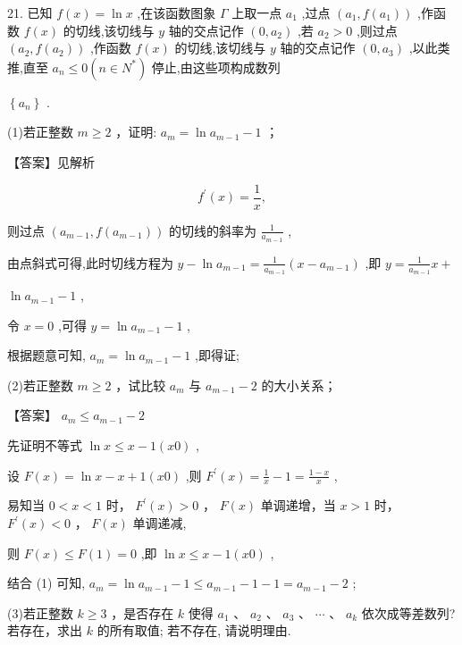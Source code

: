 \documentclass[10pt]{article}
\begin{document}
21. 已知 \(f\left( x\right)  = \ln x\) ,在该函数图象 \(\Gamma\) 上取一点 \({a}_{1}\) ,过点 \(\left( {{a}_{1},f\left( {a}_{1}\right) }\right)\) ,作函数 \(f\left( x\right)\) 的切线,该切线与 \(y\) 轴的交点记作 \(\left( {0,{a}_{2}}\right)\) ,若 \({a}_{2} > 0\) ,则过点 \(\left( {{a}_{2},f\left( {a}_{2}\right) }\right)\) ,作函数 \(f\left( x\right)\) 的切线,该切线与 \(y\) 轴的交点记作 \(\left( {0,{a}_{3}}\right)\) ,以此类推,直至 \({a}_{n} \leq  0\left( {n \in  {N}^{ * }}\right)\) 停止,由这些项构成数列

\(\left\{  {a}_{n}\right\}\) .

(1)若正整数 \(m \geq  2\) ，证明: \({a}_{m} = \ln {a}_{m - 1} - 1\) ；

【答案】见解析

\[
{f}^{\prime }\left( x\right)  = \frac{1}{x},
\]

则过点 \(\left( {{a}_{m - 1},f\left( {a}_{m - 1}\right) }\right)\) 的切线的斜率为 \(\frac{1}{{a}_{m - 1}}\) ,

由点斜式可得,此时切线方程为 \(y - \ln {a}_{m - 1} = \frac{1}{{a}_{m - 1}}\left( {x - {a}_{m - 1}}\right)\) ,即 \(y = \frac{1}{{a}_{m - 1}}x +\)

\(\ln {a}_{m - 1} - 1\) ,

令 \(x = 0\) ,可得 \(y = \ln {a}_{m - 1} - 1\) ,

根据题意可知, \({a}_{m} = \ln {a}_{m - 1} - 1\) ,即得证;

(2)若正整数 \(m \geq  2\) ，试比较 \({a}_{m}\) 与 \({a}_{m - 1} - 2\) 的大小关系；

【答案】 \({a}_{m} \leq  {a}_{m - 1} - 2\)

先证明不等式 \(\ln x \leq  x - 1\left( {x0}\right)\) ,

设 \(F\left( x\right)  = \ln x - x + 1\left( {x0}\right)\) ,则 \({F}^{\prime }\left( x\right)  = \frac{1}{x} - 1 = \frac{1 - x}{x}\) ,

易知当 \(0 < x < 1\) 时， \({F}^{\prime }\left( x\right)  > 0\) ， \(F\left( x\right)\) 单调递增，当 \(x > 1\) 时， \({F}^{\prime }\left( x\right)  < 0\) ， \(F\left( x\right)\) 单调递减,

则 \(F\left( x\right)  \leq  F\left( 1\right)  = 0\) ,即 \(\ln x \leq  x - 1\left( {x0}\right)\) ,

结合 (1) 可知, \({a}_{m} = \ln {a}_{m - 1} - 1 \leq  {a}_{m - 1} - 1 - 1 = {a}_{m - 1} - 2\) ;

(3)若正整数 \(k \geq  3\) ，是否存在 \(k\) 使得 \({a}_{1}\text{ 、 }{a}_{2}\text{ 、 }{a}_{3}\text{ 、 }\cdots \text{ 、 }{a}_{k}\) 依次成等差数列? 若存在，求出 \(k\) 的所有取值; 若不存在, 请说明理由.
\end{document}
